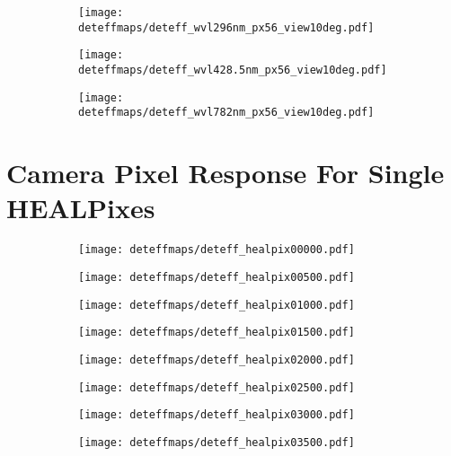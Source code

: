 \begin{figure}[H]
	\ContinuedFloat
	\centering
	\begin{subfigure}[t]{0.79\textwidth}
		\centering
		\texttt{[image: deteffmaps/deteff\_wvl296nm\_px56\_view10deg.pdf]}
		\subcaption{}
	\end{subfigure}
	\begin{subfigure}[t]{0.79\textwidth}
		\centering
		\texttt{[image: deteffmaps/deteff\_wvl428.5nm\_px56\_view10deg.pdf]}
		\subcaption{}
	\end{subfigure}	
	\begin{subfigure}[t]{0.79\textwidth}
		\centering
		\texttt{[image: deteffmaps/deteff\_wvl782nm\_px56\_view10deg.pdf]}
		\subcaption{}
	\end{subfigure}
\end{figure}

\section{Camera Pixel Response For Single HEALPixes}\label{appendix:healpixplots}

\begin{figure}[H]
	\centering
	\begin{subfigure}[t]{0.495\textwidth}
		\texttt{[image: deteffmaps/deteff\_healpix00000.pdf]}
		\subcaption{}
	\end{subfigure}
	\hfill
	\begin{subfigure}[t]{0.495\textwidth}
		\texttt{[image: deteffmaps/deteff\_healpix00500.pdf]}
		\subcaption{}
	\end{subfigure}
	\hfill
	\begin{subfigure}[t]{0.495\textwidth}
		\texttt{[image: deteffmaps/deteff\_healpix01000.pdf]}
		\subcaption{}
	\end{subfigure}
	\hfill
	\begin{subfigure}[t]{0.495\textwidth}
		\texttt{[image: deteffmaps/deteff\_healpix01500.pdf]}
		\subcaption{}
	\end{subfigure}
	\hfill
	\begin{subfigure}[t]{0.495\textwidth}
		\texttt{[image: deteffmaps/deteff\_healpix02000.pdf]}
		\subcaption{}
	\end{subfigure}
	\hfill
	\begin{subfigure}[t]{0.495\textwidth}
		\texttt{[image: deteffmaps/deteff\_healpix02500.pdf]}
		\subcaption{}
	\end{subfigure}
	\hfill
	\begin{subfigure}[t]{0.495\textwidth}
		\texttt{[image: deteffmaps/deteff\_healpix03000.pdf]}
		\subcaption{}
	\end{subfigure}
	\hfill
	\begin{subfigure}[t]{0.495\textwidth}
		\texttt{[image: deteffmaps/deteff\_healpix03500.pdf]}
		\subcaption{}
	\end{subfigure}
\end{figure}

